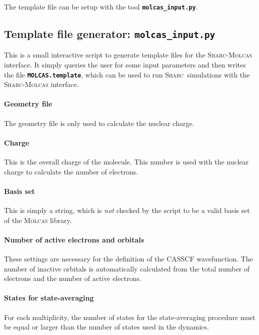 \documentclass[a4paper,11pt,DIV=15,openany,twoside=false]{scrbook}
\newcommand{\sharc}{\textsc{Sharc}}
\newcommand{\ttt}[1]{\textbf{\texttt{#1}}}
\begin{document}
The template file can be setup with the tool \ttt{molcas\_input.py}.

\subsection{Template file generator: \ttt{molcas\_input.py}}\label{sec:molcas_input.py}

This is a small interactive script to generate template files for the \sharc-\textsc{Molcas} interface. It simply queries the user for some input parameters and then writes the file \ttt{MOLCAS.template}, which can be used to run \sharc\ simulations with the \sharc-\textsc{Molcas} interface.

\paragraph{Geometry file}

The geometry file is only used to calculate the nuclear charge.

\paragraph{Charge}

This is the overall charge of the molecule. This number is used with the nuclear charge to calculate the number of electrons.

\paragraph{Basis set}

This is simply a string, which is \textit{not} checked by the script to be a valid basis set of the \textsc{Molcas} library.

\paragraph{Number of active electrons and orbitals}

These settings are necessary for the definition of the CASSCF wavefunction. The number of inactive orbitals is automatically calculated from the total number of electrons and the number of active electrons.

\paragraph{States for state-averaging}

For each multiplicity, the number of states for the state-averaging procedure must be equal or larger than the number of states used in the dynamics.
\end{document}
